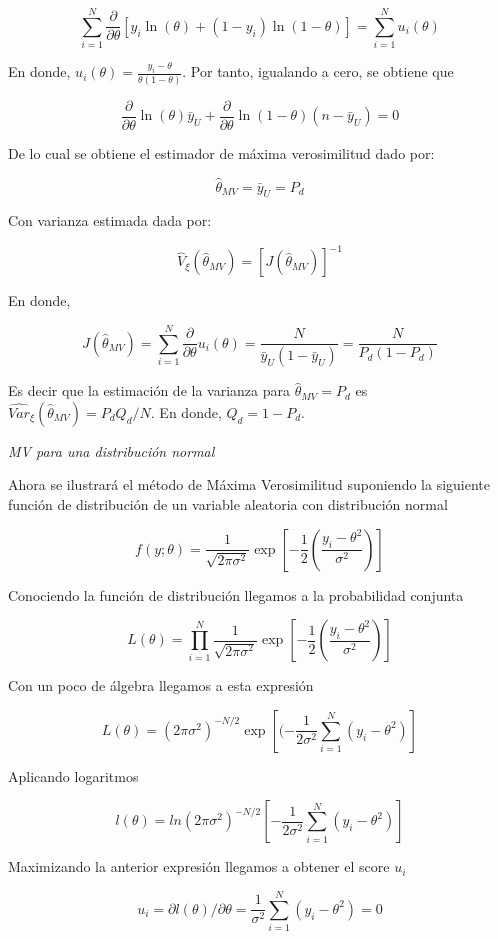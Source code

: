 \documentclass[
  spanish,
  12pt,
]{book}
\begin{document}
\[
\sum_{i=1}^{N}\frac{\partial}{\partial\theta}\left[{y_{i}}\ln(\theta)+(1-y_{i})\ln(1-\theta)\right]=\sum_{i=1}^{N}u_{i}(\theta)
\]

En donde, \(u_{i}(\theta)=\frac{y_{i}-\theta}{\theta(1-\theta)}\). Por tanto, igualando a cero, se obtiene que

\[
\frac{\partial}{\partial\theta}\ln(\theta)\bar{y}_{U}+\frac{\partial}{\partial\theta}\ln(1-\theta)(n-\bar{y}_{U})=0
\]

De lo cual se obtiene el estimador de máxima verosimilitud dado por:

\[
\hat{\theta}_{MV}=\bar{y}_{U}=P_{d}
\]

Con varianza estimada dada por:

\[
\hat{V}_{\xi}(\hat{\theta}_{MV})=[J(\hat{\theta}_{MV})]^{-1}
\]

En donde,

\[
J(\hat{\theta}_{MV})=\sum_{i=1}^{N}\frac{\partial}{\partial\theta}u_{i}(\theta)=\frac{N}{\bar{y}_{U}(1-\bar{y}_{U})}=\frac{N}{P_{d}(1-P_{d})}
\]

Es decir que la estimación de la varianza para \(\hat{\theta}_{MV}=P_{d}\)
es \(\hat{Var}_{\xi}(\hat{\theta}_{MV})=P_{d}Q_{d}/N\). En donde, \(Q_{d}=1-P_{d}\).

\emph{MV para una distribución normal}

Ahora se ilustrará el método de Máxima Verosimilitud suponiendo la siguiente función de distribución de un variable aleatoria con distribución normal

\[
f(y;\theta)=\dfrac{1}{\sqrt{2\pi\sigma^{2}}}\exp\left[-\dfrac{1}{2}\left(\dfrac{y_{i}-\theta^{2}}{\sigma^{2}}\right)\right]
\]

Conociendo la función de distribución llegamos a la probabilidad conjunta

\[
L(\theta)=\prod_{i=1}^{N}\dfrac{1}{\sqrt{2\pi\sigma^{2}}}\exp\left[-\dfrac{1}{2}\left(\dfrac{y_{i}-\theta^{2}}{\sigma^{2}}\right)\right]
\]

Con un poco de álgebra llegamos a esta expresión

\[
L(\theta)=(2\pi\sigma^{2})^{-N/2}\exp[(-\dfrac{1}{2\sigma^{2}}\sum_{i=1}^{N}(y_{i}-\theta^{2})]
\]

Aplicando logaritmos

\[
l(\theta)=ln(2\pi\sigma^{2})^{-N/2}[-\dfrac{1}{2\sigma^{2}}\sum_{i=1}^{N}(y_{i}-\theta^{2})]
\]

Maximizando la anterior expresión llegamos a obtener el score \(u_{i}\)

\[
u_{i}=\partial l(\theta)/\partial\theta=\dfrac{1}{\sigma^{2}}\sum_{i=1}^{N}(y_{i}-\theta^{2})=0
\]
\end{document}
